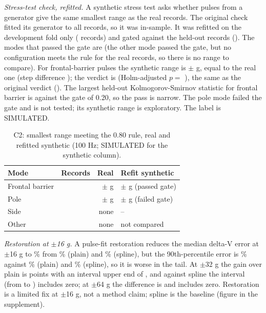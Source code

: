 \documentclass{ieeeaccess}
\begin{document}
\emph{Stress-test check, refitted.} A synthetic stress test asks whether pulses from a generator give the same smallest range as the real records. The original check fitted its generator to all \PoolN{} records, so it was in-sample. It was refitted on the development fold only (\RefitNFit{} records) and gated against the held-out records (\RefitNGate{}). The modes that passed the gate are \RefitPassed{} (the other mode passed the gate, but no configuration meets the rule for the real records, so there is no range to compare). For frontal-barrier pulses the synthetic range is $\pm$\RefitFrontSyn{} g, equal to the real one (step difference \RefitFrontStep{}); the verdict is \RefitVerdict{} (Holm-adjusted $p=$ \RefitHolm{}), the same as the original verdict (\OrigVerdict{}). The largest held-out Kolmogorov-Smirnov statistic for frontal barrier is \RefitKsFront{} against the gate of 0.20, so the pass is narrow. The pole mode failed the gate and is not tested; its synthetic range is exploratory. The label is SIMULATED.
\begin{table}[t]\centering\caption{C2: smallest range meeting the 0.80 rule, real and refitted synthetic (100 Hz; SIMULATED for the synthetic column).}\label{tab:modes}\small
\begin{tabular}{lrrl}\toprule
Mode & Records & Real & Refit synthetic\\\midrule
Frontal barrier & \ModeFrontN{} & $\pm$\ModeFrontReal{} g & $\pm$\RefitFrontSyn{} g (passed gate)\\
Pole & \ModePoleN{} & $\pm$\ModePoleReal{} g & $\pm$\RefitPoleSyn{} g (failed gate)\\
Side & \ModeSideN{} & none & --\\
Other & \ModeOtherN{} & none & not compared\\\bottomrule\end{tabular}\end{table}

\emph{Restoration at $\pm$16 g.} A pulse-fit restoration reduces the median delta-V error at $\pm$16 g to \RestMedRest\% from \RestMedPlain\% (plain) and \RestMedSpl\% (spline), but the 90th-percentile error is \RestPNinetyRest\% against \RestPNinetyPlain\% (plain) and \RestPNinetySpl\% (spline), so it is worse in the tail. At $\pm$32 g the gain over plain is \RestThirtyTwoGain{} points with an interval upper end of \RestThirtyTwoUpper{}, and against spline the interval (from \RestThirtyTwoSplLo{} to \RestThirtyTwoSplHi{}) includes zero; at $\pm$64 g the difference is \RestSixtyFourDiff{} and includes zero. Restoration is a limited fix at $\pm$16 g, not a method claim; spline is the baseline (figure in the supplement).
\end{document}

